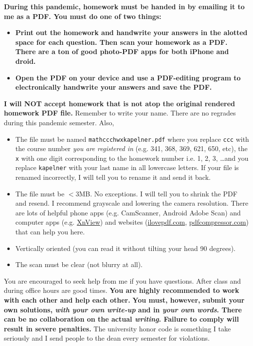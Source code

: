 \documentclass[12pt]{article}
\newcommand{\ingreen}[1]{\color{green}\textbf{#1} \color{black}}
\newcommand{\inred}[1]{\color{red}\textbf{#1} \color{black}}
\newcommand{\pdfcompressiontext}{I recommend  grayscale and lowering the camera resolution. There are lots of helpful phone apps (e.g. CamScanner, Android Adobe Scan) and computer apps (e.g. \href{http://www.xnconvert.com/downloads}{XnView})  and websites (\url{ilovepdf.com}, \url{pdfcompressor.com}) that can help you here.}
\begin{document}
\textbf{During this pandemic, homework must be handed in by emailing it to me as a PDF. You must do one of two things:}

\begin{itemize}
\item \textbf{Print out the homework and handwrite your answers in the alotted space for each question. Then scan your homework as a PDF. There are a ton of good photo-PDF apps for both iPhone and droid. }
\item \textbf{Open the PDF on your device and use a PDF-editing program to electronically handwrite your answers and save the PDF.}
\end{itemize}

\textbf{I will NOT accept homework that is not atop the original rendered homework PDF file.} Remember to write your name. There are no regrades during this pandemic semester. Also,

\begin{itemize}
\item The file must be named \texttt{mathccchwxkapelner.pdf} where you replace \texttt{ccc} with the course number \emph{you are registered in} (e.g. 341, 368, 369, 621, 650, etc), the \texttt{x} with one digit corresponding to the homework number i.e. 1, 2, 3, \ldots and you replace \texttt{kapelner} with your last name in all lowercase letters. If your file is renamed incorrectly, I will tell you to rename it and send it back.
\item The file must be $<$3MB. No exceptions. I will tell you to shrink the PDF and resend. \pdfcompressiontext
\item Vertically oriented (you can read it without tilting your head 90 degrees).
\item The scan must be clear (not blurry at all).
\end{itemize}

You are encouraged to seek help from me if you have questions. After class and during office hours are good times. \ingreen{You are highly recommended to work with each other and help each other.} \inred{You must, however, submit your own solutions, \textit{with your own write-up} and in \textit{your own words}. There can be no collaboration on the actual \textit{writing}. Failure to comply will result in severe penalties.} The university honor code is something I take seriously and I send people to the dean every semester for violations.

\end{document}
